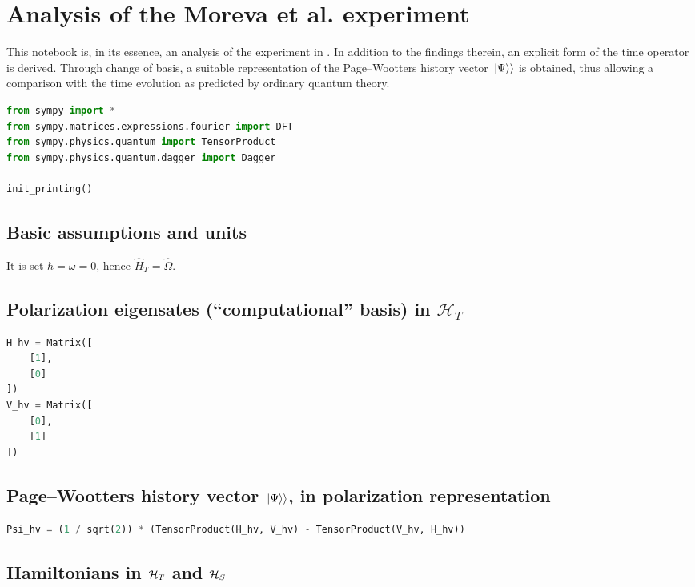 \section{Analysis of the Moreva et al. experiment}\label{sec:moreva:shit_Fourier}

This notebook is, in its essence, an analysis of the experiment in \cite{Moreva:illustration, Moreva:synthetic}.
In addition to the findings therein, an explicit form of the time operator is derived.
Through change of basis, a suitable 
representation of the Page--Wootters history vector $\left.\left| \Psi \right\rangle\right\rangle$
is obtained,
thus allowing a comparison with the time evolution
as predicted by ordinary quantum theory.

\begin{lstlisting}[language=Python]
from sympy import *
from sympy.matrices.expressions.fourier import DFT
from sympy.physics.quantum import TensorProduct
from sympy.physics.quantum.dagger import Dagger

init_printing()
\end{lstlisting}

\subsection*{Basic assumptions and units}

It is set $\hbar = \omega = 0$, hence $\hat{H}_T = \hat{\Omega}$.

\subsection*{Polarization eigensates (``computational'' basis) in $\mathcal{H}_T$}

\begin{lstlisting}[language=Python]
H_hv = Matrix([
    [1],
    [0]
])
V_hv = Matrix([
    [0],
    [1]
])
\end{lstlisting}

\subsection*{Page--Wootters history vector $\left.\left| \Psi \right\rangle\right\rangle$, in polarization representation}

\begin{lstlisting}[language=Python]
Psi_hv = (1 / sqrt(2)) * (TensorProduct(H_hv, V_hv) - TensorProduct(V_hv, H_hv))
\end{lstlisting}

\subsection*{Hamiltonians in $\mathcal{H}_T$ and $\mathcal{H}_S$}

